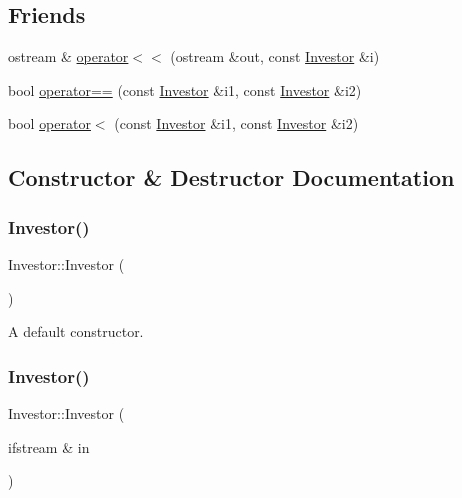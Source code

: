 \subsection*{Friends}
\begin{DoxyCompactItemize}
\item 
ostream \& \hyperlink{class_investor_a56d4a3414c2abc57af5ee9fac3435967}{operator$<$$<$} (ostream \&out, const \hyperlink{class_investor}{Investor} \&i)
\item 
bool \hyperlink{class_investor_abf836184e1217e7fadce67fea810819d}{operator==} (const \hyperlink{class_investor}{Investor} \&i1, const \hyperlink{class_investor}{Investor} \&i2)
\item 
bool \hyperlink{class_investor_a0a2b14c916980c5267b1893aa0b3dc59}{operator$<$} (const \hyperlink{class_investor}{Investor} \&i1, const \hyperlink{class_investor}{Investor} \&i2)
\end{DoxyCompactItemize}


\subsection{Constructor \& Destructor Documentation}
\mbox{\label{class_investor_a7406bf2acbfd62cc9700c7a2256e6fc9}} 
\subsubsection{\texorpdfstring{Investor()}{Investor()}\hspace{0.1cm}{\footnotesize\ttfamily [1/3]}}
{\footnotesize\ttfamily Investor\+::\+Investor (\begin{DoxyParamCaption}{ }\end{DoxyParamCaption})\hspace{0.3cm}{\ttfamily [default]}}

A default constructor. \mbox{\label{class_investor_a8c7ac9bd11c105e5c5e8067f9670ac19}} 
\subsubsection{\texorpdfstring{Investor()}{Investor()}\hspace{0.1cm}{\footnotesize\ttfamily [2/3]}}
{\footnotesize\ttfamily Investor\+::\+Investor (\begin{DoxyParamCaption}\item[{ifstream \&}]{in }\end{DoxyParamCaption})}

